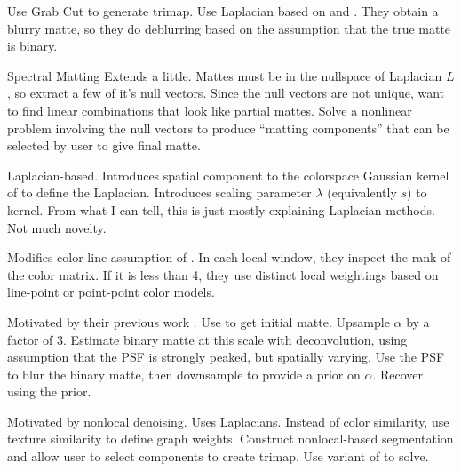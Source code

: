 \documentclass{beamer}
\begin{document}
\begin{frame}[allowframebreaks]{\cite{rhemann2008high}}
 Use Grab Cut \cite{rother2004grabcut} to generate trimap.
 Use Laplacian based on \cite{levin2008closed} and \cite{wang2007optimized}.
 They obtain a blurry matte, so they do deblurring based on the assumption that
 the true matte is binary.
\end{frame}

\begin{frame}[allowframebreaks]{Spectral Matting \cite{levin2008spectral}}
 Extends \cite{levin2008closed} a little.
 Mattes must be in the nullspace of Laplacian $L$, so extract a few of it's null vectors.
 Since the null vectors are not unique, want to find linear combinations that
 look like partial mattes.
 Solve a nonlinear problem involving the null vectors to produce ``matting components''
 that can be selected by user to give final matte.
\end{frame}

\begin{frame}[allowframebreaks]{\cite{duchenne2008segmentation}}
 Laplacian-based.
 Introduces spatial component to the colorspace Gaussian kernel of
 \cite{grady2005random} to define the Laplacian.
 Introduces scaling parameter $\lambda$ (equivalently $s$) to kernel.
 From what I can tell, this is just mostly explaining Laplacian methods. Not much novelty.
\end{frame}

\begin{frame}[allowframebreaks]{\cite{singaraju2009new}}
 Modifies color line assumption of \cite{levin2008closed}.
 In each local window, they inspect the rank of the color matrix.
 If it is less than 4, they use distinct local weightings based on line-point
 or point-point color models.
\end{frame}

\begin{frame}[allowframebreaks]{\cite{rhemann2010spatially}}
 Motivated by their previous work \cite{rhemann2008high}.
 Use \cite{rhemann2008high} to get initial matte.
 Upsample $\alpha$ by a factor of 3.
 Estimate binary matte at this scale with deconvolution, using assumption that
 the PSF is strongly peaked, but spatially varying.
 Use the PSF to blur the binary matte, then downsample to provide a prior on $\alpha$.
 Recover using the prior.
\end{frame}

\begin{frame}[allowframebreaks]{\cite{lee2011nonlocal}}
 Motivated by nonlocal denoising.
 Uses Laplacians.
 Instead of color similarity, use texture similarity to define graph weights.
 Construct nonlocal-based segmentation and allow user to select components
 to create trimap.
 Use variant of \cite{levin2008closed} to solve.
\end{frame}
\end{document}
